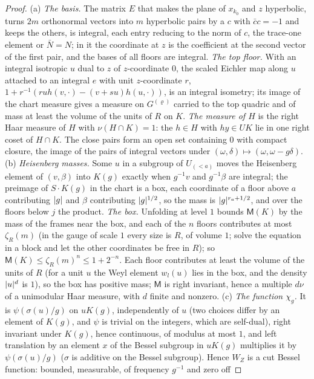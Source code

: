 \begin{proof}
(a) \emph{The basis.} The matrix $E$ that makes the plane of $x_{k_0}$ and $z$ hyperbolic, turns $2m$ orthonormal vectors into $m$ hyperbolic pairs by a $c$ with $\bar cc=-1$ and keeps the others, is integral, each entry reducing to the norm of $c$,
the trace-one element or $\bar N=N$; in it the coordinate at $z$ is the coefficient at the second vector of the first pair, and the bases of all floors are integral. \emph{The top floor.} With an integral isotropic $u$ dual to $z$ of $z$-coordinate $0$, the
scaled Eichler map along $u$ attached to an integral $e$ with unit $z$-coordinate $r$, $1+r^{-1}(ruh(v,\cdot)-(v+su)h(u,\cdot))$, is an integral isometry; its image of the chart measure gives a measure on $G^{(\varrho)}$ carried to the top quadric
and of mass at least the volume of the units of $R$ on $K$. \emph{The measure of $H$} is the right Haar measure of $H$ with $\nu(H\cap K)=1$: the $h\in H$ with $hy\in UK$ lie in one right coset of $H\cap K$. The close pairs form an open set containing $0$ with
compact closure, the image of the pairs of integral vectors under $(\omega,\delta)\mapsto(\omega,\omega-g\delta)$.
(b) \emph{Heisenberg masses.} Some $u$ in a subgroup of $U_{(<a)}$ moves the Heisenberg element of $(v,\beta)$ into $K(g)$ exactly when $g^{-1}v$ and $g^{-1}\beta$ are integral; the preimage of $S\cdot K(g)$ in the chart is a box, each coordinate of a floor above
$a$ contributing $\lvert g\rvert$ and $\beta$ contributing $\lvert g\rvert^{1/2}$, so the mass is $\lvert g\rvert^{r_a+1/2}$, and over the floors below $j$ the product. \emph{The box.} Unfolding at level $1$ bounds $\mathsf M(K)$ by the mass of the frames near the box, and each of
the $n$ floors contributes at most $\zeta_R(m)$ (in the gauge of scale $1$ every size is $R$, of volume $1$; solve the equation in a block and let the other coordinates be free in $R$); so $\mathsf M(K)\le\zeta_R(m)^n\le1+2^{-n}$. Each floor
contributes at least the volume of the units of $R$ (for a unit $u$ the Weyl element $w_l(u)$ lies in the box, and the density $\lvert u\rvert^d$ is $1$), so the box has positive mass; $\mathsf M$ is right invariant, hence a multiple $d\nu$ of a unimodular
Haar measure, with $d$ finite and nonzero.
(c) \emph{The function $\chi_g$.} It is $\psi(\sigma(u)/g)$ on $uK(g)$, independently of $u$ (two choices differ by an element of $K(g)$, and $\psi$ is trivial on the integers, which are self-dual), right invariant under $K(g)$, hence continuous, of modulus
at most $1$, and left translation by an element $x$ of the Bessel subgroup in $uK(g)$ multiplies it by $\psi(\sigma(u)/g)$ ($\sigma$ is additive on the Bessel subgroup). Hence $W_Z$ is a cut Bessel function: bounded, measurable, of frequency $g^{-1}$ and zero off

\end{proof}

